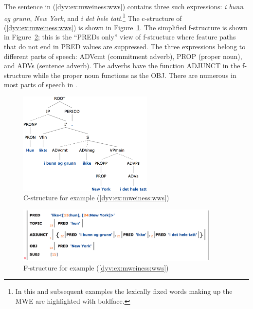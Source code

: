 \documentclass[output=paper]{langsci/langscibook}
\begin{document}
The sentence in (\ref{dyv:ex:mweiness:wws}) contains three such expressions: \textit{i bunn og grunn}, \textit{New York}, and \textit{i det hele tatt}.\footnote{In this and subsequent examples the lexically fixed words making up the MWE are highlighted with boldface.}
The c-structure of (\ref{dyv:ex:mweiness:wws}) is shown in Figure~\ref{dyv:fig:mweiness:wws-cstr}.
The simplified f-structure is shown in Figure~\ref{dyv:fig:mweiness:wws-fstr}; this is the ``PREDs only'' view of f-structure where feature paths that do not end in PRED values are suppressed. 
The three expressions belong to different parts of speech: ADVcmt (commitment adverb), PROP (proper noun), and ADVs (sentence adverb).
The adverbs have the function ADJUNCT in the f-structure while the proper noun functions as the OBJ.
There are numerous  in most parts of speech in .

%
\begin{figure}
  \includegraphics[width=0.6\textwidth]{figures/wws-cstr}
  \caption{C-structure for example (\ref{dyv:ex:mweiness:wws})}
  \label{dyv:fig:mweiness:wws-cstr}
\end{figure}

\begin{figure}
  \includegraphics[width=0.9\textwidth]{figures/wws-fstr}
  \caption{F-structure for example (\ref{dyv:ex:mweiness:wws})}
  \label{dyv:fig:mweiness:wws-fstr}
\end{figure}
\end{document}
